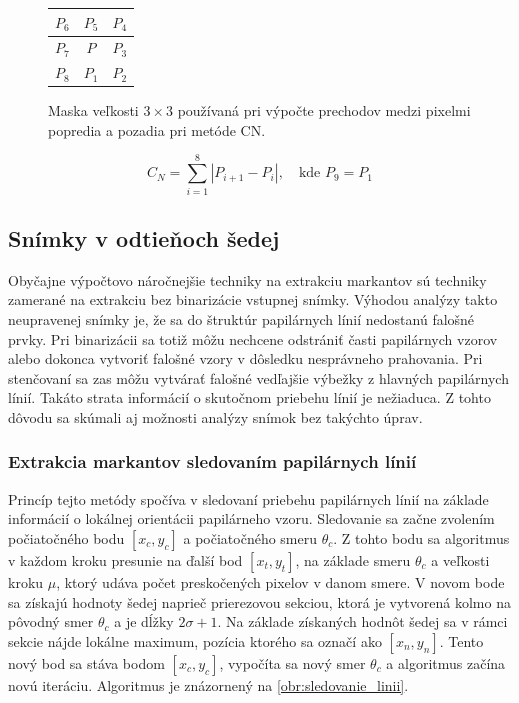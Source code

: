   \begin{figure}[h]
    \centering
      \begin{tabular}{ | l | c | r | }
        \hline
        $P_6$ & $P_5$ & $P_4$ \\ \hline
        $P_7$ & $P$ & $P_3$ \\ \hline
        $P_8$ & $P_1$ & $P_2$ \\
        \hline
      \end{tabular}
    \caption{Maska veľkosti $3\times{}3$ používaná pri výpočte prechodov medzi pixelmi popredia a pozadia pri metóde CN.}
    \label{obr:maska_CN}
  \end{figure}

  \begin{equation}
    C_N = \sum_{i=1}^{8} | P_{i+1} - P_{i} |, \quad\text{kde } P_9 = P_1
    \label{rov:crossing_number}
  \end{equation}

  \subsection{Snímky v odtieňoch šedej}
  Obyčajne výpočtovo náročnejšie techniky na extrakciu markantov sú techniky zamerané na extrakciu bez binarizácie vstupnej snímky. Výhodou analýzy
  takto neupravenej snímky je, že sa do štruktúr papilárnych línií nedostanú falošné prvky. Pri binarizácii sa totiž môžu nechcene odstrániť časti
  papilárnych vzorov alebo dokonca vytvoriť falošné vzory v dôsledku nesprávneho prahovania. Pri stenčovaní sa zas môžu vytvárať falošné vedľajšie výbežky
  z hlavných papilárnych línií. Takáto strata informácií o skutočnom priebehu línií je nežiaduca. Z tohto dôvodu sa skúmali aj možnosti analýzy snímok bez
  takýchto úprav.

  \subsubsection*{Extrakcia markantov sledovaním papilárnych línií}
  Princíp tejto metódy spočíva v sledovaní priebehu papilárnych línií na základe informácií o lokálnej orientácii papilárneho vzoru. Sledovanie sa začne
  zvolením počiatočného bodu $[x_c, y_c]$ a počiatočného smeru $\theta{}_c$. Z tohto bodu sa algoritmus v každom kroku presunie na ďalší bod $[x_t, y_t]$,
  na základe smeru $\theta{}_c$ a veľkosti kroku $\mu$, ktorý udáva počet preskočených pixelov v danom smere. V novom bode sa získajú hodnoty šedej
  naprieč prierezovou sekciou, ktorá je vytvorená kolmo na pôvodný smer $\theta{}_c$ a je dĺžky $2\sigma + 1$. Na základe získaných hodnôt šedej sa
  v rámci sekcie nájde lokálne maximum, pozícia ktorého sa označí ako $[x_n, y_n]$. Tento nový bod sa stáva bodom $[x_c, y_c]$,
  vypočíta sa nový smer $\theta{}_c$ a algoritmus začína novú iteráciu. Algoritmus je znázornený na \ref{obr:sledovanie_linii}.

